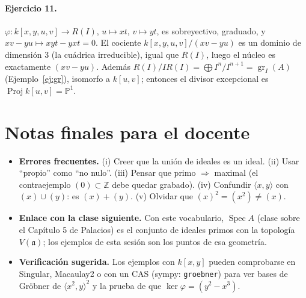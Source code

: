 \documentclass[11pt,a4paper]{article}
\newcommand{\Spec}{\operatorname{Spec}}
\newcommand{\Proj}{\operatorname{Proj}}
\newcommand{\gr}{\operatorname{gr}}
\newcommand{\ZZ}{\mathbb{Z}}
\newcommand{\PP}{\mathbb{P}}
\newcommand{\aaa}{\mathfrak{a}}
\newcommand{\gen}[1]{\langle #1\rangle}
\theoremstyle{plain}
\theoremstyle{definition}
\theoremstyle{remark}
\newcounter{ej}
\begin{document}
\paragraph{Ejercicio 11.} $\varphi:k[x,y,u,v]\to R(I)$, $u\mapsto xt$, $v\mapsto yt$, es sobreyectivo, graduado, y $xv-yu\mapsto xyt-yxt=0$. El cociente $k[x,y,u,v]/(xv-yu)$ es un dominio de dimensión $3$ (la cuádrica irreducible), igual que $R(I)$, luego el núcleo es exactamente $(xv-yu)$. Además $R(I)/IR(I)=\bigoplus I^n/I^{n+1}=\gr_I(A)$ (Ejemplo~\ref{ej:gr}), isomorfo a $k[u,v]$; entonces el divisor excepcional es $\Proj k[u,v]=\PP^1$.

\section*{Notas finales para el docente}

\begin{itemize}[itemsep=2pt]
\item \textbf{Errores frecuentes.} (i) Creer que la unión de ideales es un ideal. (ii) Usar ``propio'' como ``no nulo''. (iii) Pensar que primo $\Rightarrow$ maximal (el contraejemplo $(0)\subset\ZZ$ debe quedar grabado). (iv) Confundir $\gen{x,y}$ con $(x)\cup(y)$: es $(x)+(y)$. (v) Olvidar que $(x)^2=(x^2)\ne(x)$.
\item \textbf{Enlace con la clase siguiente.} Con este vocabulario, $\Spec A$ (clase sobre el Capítulo 5 de Palacios) es el conjunto de ideales primos con la topología $V(\aaa)$; los ejemplos de esta sesión son los puntos de esa geometría.
\item \textbf{Verificación sugerida.} Los ejemplos con $k[x,y]$ pueden comprobarse en Singular, Macaulay2 o con un CAS (sympy: \texttt{groebner}) para ver bases de Gröbner de $\gen{x^2,y}^2$ y la prueba de que $\ker\varphi=(y^2-x^3)$.
\end{itemize}
\end{document}
